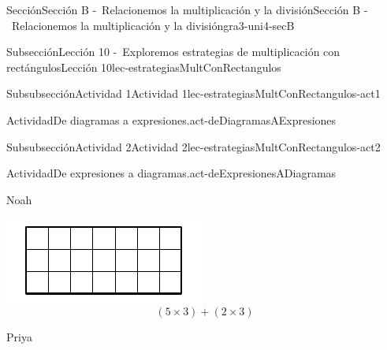 \begin{sectionptx}{Sección}{Sección B -~Relacionemos la multiplicación y la división}{}{Sección B -~Relacionemos la multiplicación y la división}{}{}{gra3-uni4-secB}
\begin{subsectionptx}{Subsección}{Lección 10 -~Exploremos estrategias de multiplicación con rectángulos}{}{Lección 10}{}{}{lec-estrategiasMultConRectangulos}
\begin{subsubsectionptx}{Subsubsección}{Actividad 1}{}{Actividad 1}{}{}{lec-estrategiasMultConRectangulos-act1}
\begin{activity}{Actividad}{De diagramas a expresiones.}{act-deDiagramasAExpresiones}
\begin{enumerate}
\begin{enumerate}
\end{enumerate}
\end{enumerate}
\end{activity}%
\end{subsubsectionptx}
%
%
\typeout{************************************************}
\typeout{************************************************}
%
\begin{subsubsectionptx}{Subsubsección}{Actividad 2}{}{Actividad 2}{}{}{lec-estrategiasMultConRectangulos-act2}
\begin{activity}{Actividad}{De expresiones a diagramas.}{act-deExpresionesADiagramas}%
\begin{sidebyside}{3}{0.0166666666666667}{0.0166666666666667}{0.0333333333333333}%
\begin{sbspanel}{0.3}%
Noah%
\par
\includegraphics[max width=\linewidth, center]{external/svg-source/tikz-file-153051.pdf}
%
\begin{equation*}
(5\times 3)+(2 \times 3)
\end{equation*}
%
\end{sbspanel}%
\begin{sbspanel}{0.3}%
Priya%
\par

\end{sbspanel}
\end{sidebyside}
\end{activity}
\end{subsubsectionptx}
\end{subsectionptx}
\end{sectionptx}

